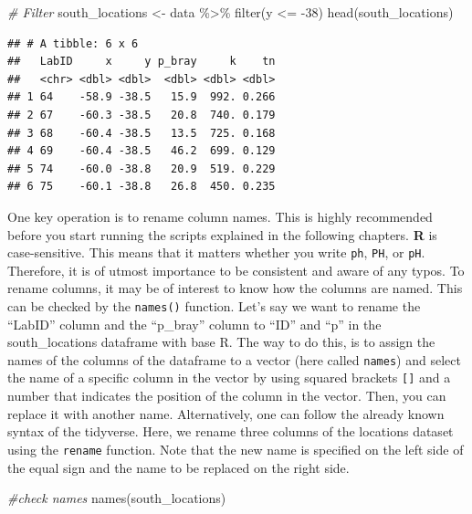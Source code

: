\documentclass[
  10pt,
  b5paper,
  oneside]{book}
\newenvironment{Shaded}{\begin{snugshade}}{\end{snugshade}}
\newcommand{\CommentTok}[1]{\textcolor[rgb]{0.56,0.35,0.01}{\textit{#1}}}
\newcommand{\DecValTok}[1]{\textcolor[rgb]{0.00,0.00,0.81}{#1}}
\newcommand{\FunctionTok}[1]{\textcolor[rgb]{0.00,0.00,0.00}{#1}}
\newcommand{\NormalTok}[1]{#1}
\newcommand{\OtherTok}[1]{\textcolor[rgb]{0.56,0.35,0.01}{#1}}
\newcommand{\SpecialCharTok}[1]{\textcolor[rgb]{0.00,0.00,0.00}{#1}}
\begin{document}
\begin{Shaded}
\begin{Highlighting}[]
\CommentTok{\# Filter}
\NormalTok{south\_locations }\OtherTok{\textless{}{-}}\NormalTok{ data }\SpecialCharTok{\%\textgreater{}\%} \FunctionTok{filter}\NormalTok{(y }\SpecialCharTok{\textless{}=} \SpecialCharTok{{-}}\DecValTok{38}\NormalTok{)}
\FunctionTok{head}\NormalTok{(south\_locations)}
\end{Highlighting}
\end{Shaded}

\begin{verbatim}
## # A tibble: 6 x 6
##   LabID     x     y p_bray     k    tn
##   <chr> <dbl> <dbl>  <dbl> <dbl> <dbl>
## 1 64    -58.9 -38.5   15.9  992. 0.266
## 2 67    -60.3 -38.5   20.8  740. 0.179
## 3 68    -60.4 -38.5   13.5  725. 0.168
## 4 69    -60.4 -38.5   46.2  699. 0.129
## 5 74    -60.0 -38.8   20.9  519. 0.229
## 6 75    -60.1 -38.8   26.8  450. 0.235
\end{verbatim}

One key operation is to rename column names. This is highly recommended before you start running the scripts explained in the following chapters. \textbf{R} is case-sensitive. This means that it matters whether you write \texttt{ph}, \texttt{PH}, or \texttt{pH}. Therefore, it is of utmost importance to be consistent and aware of any typos. To rename columns, it may be of interest to know how the columns are named. This can be checked by the \texttt{names()} function.
Let's say we want to rename the ``LabID'' column and the ``p\_bray'' column to ``ID'' and ``p'' in the south\_locations dataframe with base R. The way to do this, is to assign the names of the columns of the dataframe to a vector (here called \texttt{names}) and select the name of a specific column in the vector by using squared brackets \texttt{{[}{]}} and a number that indicates the position of the column in the vector. Then, you can replace it with another name.
Alternatively, one can follow the already known syntax of the tidyverse. Here, we rename three columns of the locations dataset using the \texttt{rename} function. Note that the new name is specified on the left side of the equal sign and the name to be replaced on the right side.

\begin{Shaded}
\begin{Highlighting}[]
\CommentTok{\#check names}
\FunctionTok{names}\NormalTok{(south\_locations)}
\end{Highlighting}
\end{Shaded}
\end{document}
